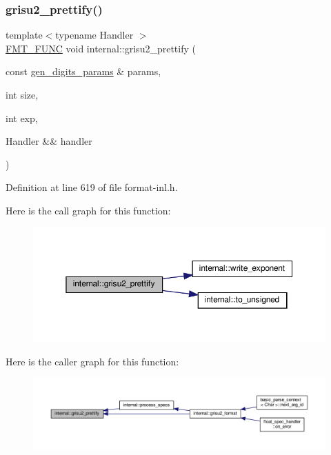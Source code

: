 \subsubsection{\texorpdfstring{grisu2\+\_\+prettify()}{grisu2\_prettify()}}
{\footnotesize\ttfamily template$<$typename Handler $>$ \\
\hyperlink{format_8h_a02c8898388e0ae59aab58be14fcd4e05}{F\+M\+T\+\_\+\+F\+U\+NC} void internal\+::grisu2\+\_\+prettify (\begin{DoxyParamCaption}\item[{const \hyperlink{structinternal_1_1gen__digits__params}{gen\+\_\+digits\+\_\+params} \&}]{params,  }\item[{int}]{size,  }\item[{int}]{exp,  }\item[{Handler \&\&}]{handler }\end{DoxyParamCaption})}



Definition at line 619 of file format-\/inl.\+h.

Here is the call graph for this function\+:
\nopagebreak
\begin{figure}[H]
\begin{center}
\leavevmode
\includegraphics[width=350pt]{namespaceinternal_a868ca3301073105fcbd25d79ff98ca16_cgraph}
\end{center}
\end{figure}
Here is the caller graph for this function\+:
\nopagebreak
\begin{figure}[H]
\begin{center}
\leavevmode
\includegraphics[width=350pt]{namespaceinternal_a868ca3301073105fcbd25d79ff98ca16_icgraph}
\end{center}
\end{figure}
\mbox{\label{namespaceinternal_afc76db0ad587455f6942b74d175ee56a}} 
